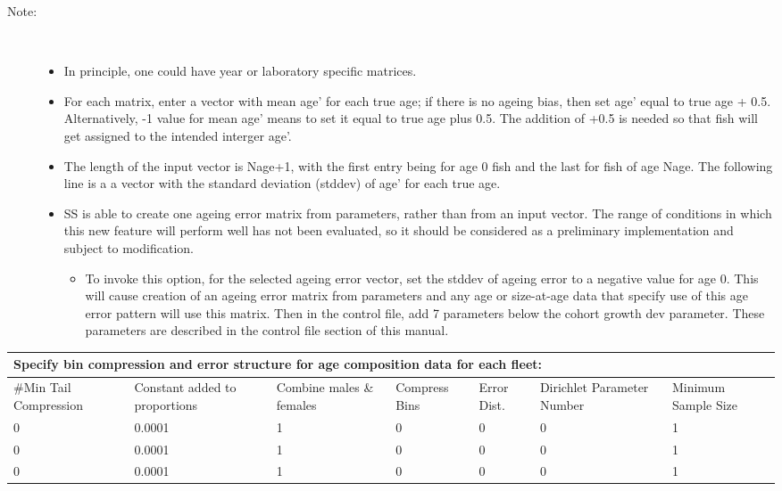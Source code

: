 \begin{description}
	\item[Note:]\
	\begin{itemize}		
		\item In principle, one could have year or laboratory specific matrices.
		\item For each matrix, enter a vector with mean age’ for each true age; if there is no ageing bias, then set age’ equal to true age + 0.5.  Alternatively, -1 value for mean age’ means to set it equal to true age plus 0.5.  The addition of +0.5 is needed so that fish will get assigned to the intended interger age’.
		\item The length of the input vector is Nage+1, with the first entry being for age 0 fish and the last for fish of age Nage. The following line is a a vector with the standard deviation (stddev) of age’ for each true age.
		\item SS is able to create one ageing error matrix from parameters, rather than from an input vector.  The range of conditions in which this new feature will perform well has not been evaluated, so it should be considered as a preliminary implementation and subject to modification.
			\begin{itemize}
				\item To invoke this option, for the selected ageing error vector, set the stddev of ageing error to a negative value for age 0.  This will cause creation of an ageing error matrix from parameters and any age or size-at-age data that specify use of this age error pattern will use this matrix. Then in the control file, add 7 parameters below the cohort growth dev parameter.  These parameters are described in the control file section of this manual.
			\end{itemize}			  
	\end{itemize}
\end{description}


\begin{tabular}{p{2cm} p{2cm} p{2cm} p{1.5cm} p{1.5cm} p{2cm} p{2cm}}
		\multicolumn{7}{l}{Specify bin compression and error structure for age composition data for each fleet:}\\
		\hline
		\#Min Tail Compression & Constant added to proportions & Combine males \& females & Compress Bins & Error Dist. & Dirichlet Parameter Number & Minimum Sample Size\\
		\hline
		0 & 0.0001 & 1 & 0 & 0 & 0 & 1 \\
		0 & 0.0001 & 1 & 0 & 0 & 0 & 1 \\
		0 & 0.0001 & 1 & 0 & 0 & 0 & 1 \\
		\hline
\end{tabular}

